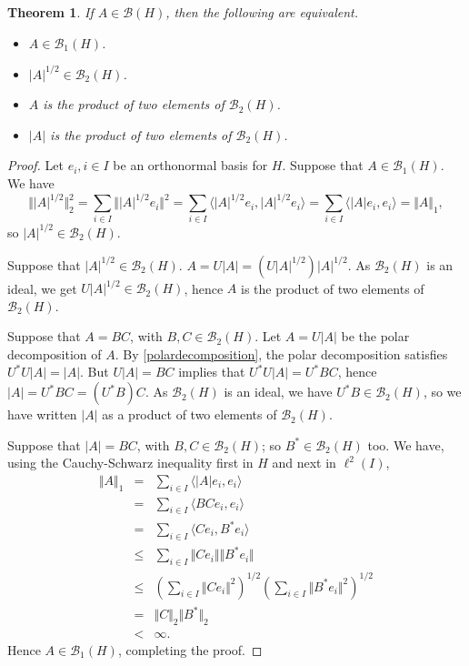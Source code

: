 \documentclass{article}
\newcommand{\inner}[2]{\langle #1, #2 \rangle}
\newcommand{\norm}[1]{\Vert #1 \Vert}
\newtheorem{theorem}{Theorem}
\begin{document}
\begin{theorem}
If $A \in \mathscr{B}(H)$, then the following are equivalent.
\begin{itemize}
\item $A \in \mathscr{B}_1(H)$.
\item $|A|^{1/2} \in \mathscr{B}_2(H)$.
\item $A$ is the product of two elements of $\mathscr{B}_2(H)$.
\item $|A|$ is the product of two elements of $\mathscr{B}_2(H)$.
\end{itemize}
\label{traceTFAE}
\end{theorem}
\begin{proof}
Let $e_i, i \in I$ be an orthonormal basis for $H$.
Suppose that $A \in \mathscr{B}_1(H)$. We have
\[
\norm{|A|^{1/2}}_2^2=\sum_{i \in I} \norm{|A|^{1/2}e_i}^2 = \sum_{i \in I} \inner{|A|^{1/2}e_i}{|A|^{1/2}e_i}=\sum_{i \in I} \inner{|A|e_i}{e_i} = \norm{A}_1,
\]
so $|A|^{1/2} \in \mathscr{B}_2(H)$.

Suppose that $|A|^{1/2} \in \mathscr{B}_2(H)$. $A=U|A|=(U|A|^{1/2}) |A|^{1/2}$. As $\mathscr{B}_2(H)$ is an ideal,
we get $U|A|^{1/2} \in \mathscr{B}_2(H)$, hence $A$ is the product of two elements of $\mathscr{B}_2(H)$.

Suppose that $A=BC$, with $B,C \in \mathscr{B}_2(H)$. Let $A=U|A|$ be the polar decomposition of $A$. By 
\eqref{polardecomposition}, the polar decomposition satisfies $U^*U|A|=|A|$. 
But $U|A|=BC$ implies that $U^*U|A|=U^*BC$, hence $|A|=U^*BC=(U^*B)C$. As $\mathscr{B}_2(H)$ is an ideal, we have $U^*B \in \mathscr{B}_2(H)$, so we have written $|A|$ as a product of two elements of
$\mathscr{B}_2(H)$.

Suppose that $|A|=BC$, with  $B,C \in \mathscr{B}_2(H)$; so $B^* \in \mathscr{B}_2(H)$ too. We have, using the Cauchy-Schwarz inequality first in $H$ and next in $\ell^2(I)$,
\begin{eqnarray*}
\norm{A}_1&=&\sum_{i \in I} \inner{|A|e_i}{e_i}\\
&=&\sum_{i \in I} \inner{BCe_i}{e_i}\\
&=&\sum_{i \in I} \inner{Ce_i}{B^*e_i}\\
&\leq&\sum_{i \in I} \norm{Ce_i}\norm{B^*e_i}\\
&\leq&\left( \sum_{i \in I} \norm{Ce_i}^2 \right)^{1/2} \left( \sum_{i \in I} \norm{B^*e_i}^2 \right)^{1/2}\\
&=&\norm{C}_2 \norm{B^*}_2\\
&<&\infty.
\end{eqnarray*}
Hence $A \in \mathscr{B}_1(H)$, completing the proof.
\end{proof}
\end{document}
